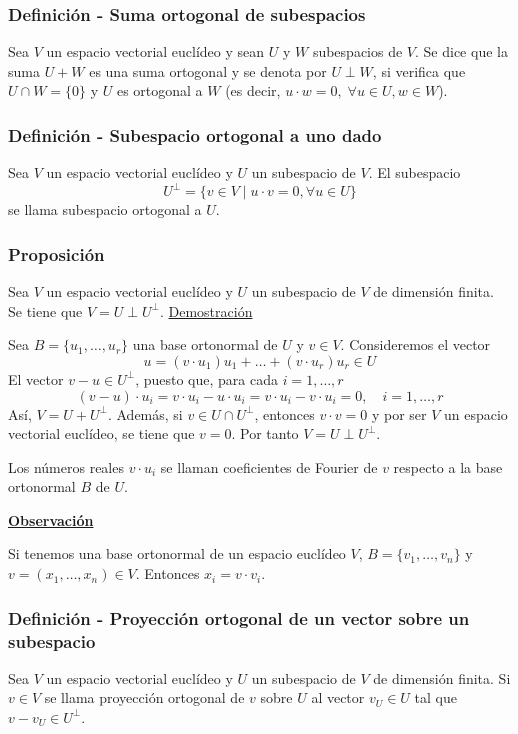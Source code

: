 \documentclass[12pt, a4paper, ones, notitlepage, openany,titlepage]{article}
\newcommand{\demostracion}{\noindent\underline{Demostración}}
\newcommand{\observacion}{\noindent\underline{\textbf{Observación}}}
\begin{document}
\subsubsection{Definición - Suma ortogonal de subespacios}
Sea $V$ un espacio vectorial euclídeo y sean $U$ y $W$ subespacios de $V$. Se dice que la suma $U+W$ es una suma ortogonal y se denota por $U \perp W$, si verifica que $U \cap W=\{0\}$ y $U$ es ortogonal a $W$ (es decir, $u \cdot w = 0, \; \forall u \in U, w\in W$).

\subsubsection{Definición - Subespacio ortogonal a uno dado}
\noindent Sea $V$ un espacio vectorial euclídeo y $U$ un subespacio de $V$. El subespacio
$$
U^{\perp}=\{v \in V \mid u \cdot v=0, \forall u \in U\}
$$
se llama subespacio ortogonal a $U$.

\subsubsection{Proposición}
Sea $V$ un espacio vectorial euclídeo y $U$ un subespacio de $V$ de dimensión finita. Se tiene que $V=U \perp U^{\perp}$.
\demostracion

Sea $B=\{u_{1}, \ldots, u_{r}\}$ una base ortonormal de $U$ y $v \in V$. Consideremos el vector
$$
u=\left(v \cdot u_{1}\right) u_{1}+\ldots+\left(v \cdot u_{r}\right) u_{r} \in U
$$
El vector $v-u \in U^{\perp}$, puesto que, para cada $i=1, \ldots, r$
$$
(v-u) \cdot u_{i}=v \cdot u_{i}-u \cdot u_{i}=v \cdot u_{i}-v \cdot u_{i}=0, \quad i=1, \ldots, r
$$
Así, $V=U+U^{\perp}$. Además, si $v \in U \cap U^{\perp}$, entonces $v \cdot v=0$ y por ser $V$ un espacio vectorial euclídeo, se tiene que $v=0$. Por tanto $V=U \perp U^{\perp}$.

Los números reales $v \cdot u_{i}$ se llaman coeficientes de Fourier de $v$ respecto a la base ortonormal $B$ de $U$.

\observacion

Si tenemos una base ortonormal de un espacio euclídeo $V$, $B = \{v_1,\ldots,v_n\}$ y $v = (x_1,\ldots,x_n)\in V$. Entonces $x_i = v \cdot v_i$.

\subsubsection{Definición - Proyección ortogonal de un vector sobre un subespacio} Sea $V$ un espacio vectorial euclídeo y $U$ un subespacio de $V$ de dimensión finita. Si $v \in V$ se llama proyección ortogonal de $v$ sobre $U$ al vector $v_{U} \in U$ tal que $v-v_{U} \in U^{\perp}$.
\end{document}
